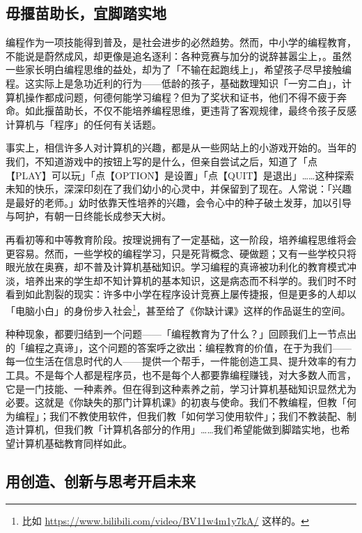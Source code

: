 \subsection{毋揠苗助长，宜脚踏实地}

编程作为一项技能得到普及，是社会进步的必然趋势。然而，中小学的编程教育，不能说是蔚然成风，却更像是追名逐利：各种竞赛与加分的说辞甚嚣尘上，。虽然一些家长明白编程思维的益处，却为了「不输在起跑线上」，希望孩子尽早接触编程。这实际上是急功近利的行为——低龄的孩子，基础数理知识「一穷二白」，计算机操作都成问题，何德何能学习编程？但为了奖状和证书，他们不得不疲于奔命。如此揠苗助长，不仅不能培养编程思维，更违背了客观规律，最终令孩子反感计算机与「程序」的任何有关话题。

事实上，相信许多人对计算机的兴趣，都是从一些网站上的小游戏开始的。当年的我们，不知道游戏中的按钮上写的是什么，但亲自尝试之后，知道了「点【PLAY】可以玩」「点【OPTION】是设置」「点【QUIT】是退出」……这种探索未知的快乐，深深印刻在了我们幼小的心灵中，并保留到了现在。人常说：「兴趣是最好的老师。」幼时依靠天性培养的兴趣，会令心中的种子破土发芽，加以引导与呵护，有朝一日终能长成参天大树。

再看初等和中等教育阶段。按理说拥有了一定基础，这一阶段，培养编程思维将会更容易。然而，一些学校的编程学习，只是死背概念、硬做题；又有一些学校只将眼光放在奥赛，却不普及计算机基础知识。学习编程的真谛被功利化的教育模式冲淡，培养出来的学生却不知计算机的基本知识，这是病态而不科学的。我们时不时看到如此割裂的现实：许多中小学在程序设计竞赛上屡传捷报，但是更多的人却以「电脑小白」的身份步入社会\footnote{比如 \url{https://www.bilibili.com/video/BV11w4m1y7kA/} 这样的。}，甚至给了《你缺计课》这样的作品诞生的空间。

种种现象，都要归结到一个问题——「编程教育为了什么？」回顾我们上一节点出的「编程之真谛」，这个问题的答案呼之欲出：编程教育的价值，在于为我们——每一位生活在信息时代的人——提供一个帮手，一件能创造工具、提升效率的有力工具。不是每个人都是程序员，也不是每个人都要靠编程赚钱，对大多数人而言，它是一门技能、一种素养。但在得到这种素养之前，学习计算机基础知识显然尤为必要。这就是《你缺失的那门计算机课》的初衷与使命。我们不教编程，但教「何为编程」；我们不教使用软件，但我们教「如何学习使用软件」；我们不教装配、制造计算机，但我们教「计算机各部分的作用」……我们希望能做到脚踏实地，也希望计算机基础教育同样如此。

\subsection{用创造、创新与思考开启未来}

